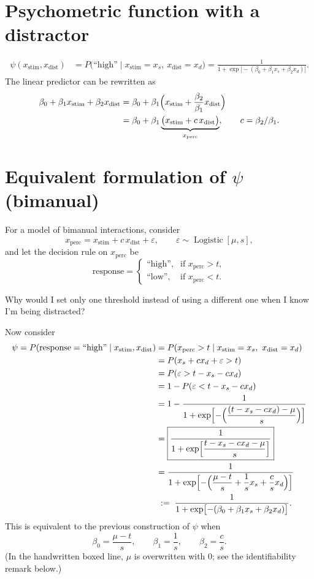 \documentclass[11pt]{article}
\newcommand{\xs}{x_{\text{stim}}}
\newcommand{\xd}{x_{\text{dist}}}
\newcommand{\xp}{x_{\text{perc}}}
\newcommand{\high}{\text{``high''}}
\newcommand{\low}{\text{``low''}}
\begin{document}
\section{Psychometric function with a distractor}

\begin{align*}
  \psi(\xs,\xd) &= P\bigl(\high \mid \xs = x_s,\ \xd = x_d\bigr)
  = \frac{1}{1+\exp\bigl[-(\beta_0+\beta_1 x_s+\beta_2 x_d)\bigr]}.
\end{align*}
The linear predictor can be rewritten as
\begin{align*}
  \beta_0+\beta_1\xs+\beta_2\xd
  &= \beta_0+\beta_1\Bigl(\xs+\frac{\beta_2}{\beta_1}\xd\Bigr)\\
  &= \beta_0+\beta_1\underbrace{\bigl(\xs+c\,\xd\bigr)}_{\xp},
  \qquad c = \beta_2/\beta_1 .
\end{align*}

\section{Equivalent formulation of $\psi$ (bimanual)}

For a model of bimanual interactions, consider
\[
  \xp = \xs + c\,\xd + \varepsilon, \qquad \varepsilon \sim \operatorname{Logistic}[\mu,s],
\]
and let the decision rule on $\xp$ be
\[
  \text{response} =
  \begin{cases}
    \high, & \text{if } \xp > t,\\
    \low,  & \text{if } \xp < t.
  \end{cases}
\]

\begin{aside}
Why would I set only one threshold instead of using a different one when I know
I'm being distracted?
\end{aside}

Now consider
\begin{align*}
  \psi = P(\text{response}=\high \mid \xs,\xd)
  &= P(\xp > t \mid \xs = x_s,\ \xd = x_d)\\
  &= P(x_s + c x_d + \varepsilon > t)\\
  &= P(\varepsilon > t - x_s - c x_d)\\
  &= 1 - P(\varepsilon < t - x_s - c x_d)\\
  &= 1 - \frac{1}{1+\exp\Bigl[-\Bigl(\dfrac{(t-x_s-c x_d)-\mu}{s}\Bigr)\Bigr]}\\
  &= \boxed{\frac{1}{1+\exp\Bigl[\dfrac{t-x_s-c x_d-\mu}{s}\Bigr]}}\\
  &= \frac{1}{1+\exp\Bigl[-\Bigl(\dfrac{\mu-t}{s}+\dfrac{1}{s}x_s+\dfrac{c}{s}x_d\Bigr)\Bigr]}\\
  &\;:=\; \frac{1}{1+\exp\bigl[-(\beta_0+\beta_1 x_s+\beta_2 x_d)\bigr]}.
\end{align*}
This is equivalent to the previous construction of $\psi$ when
\[
  \beta_0 = \frac{\mu-t}{s},\qquad \beta_1 = \frac{1}{s},\qquad \beta_2 = \frac{c}{s}.
\]
(In the handwritten boxed line, $\mu$ is overwritten with $0$; see the identifiability
remark below.)
\end{document}
